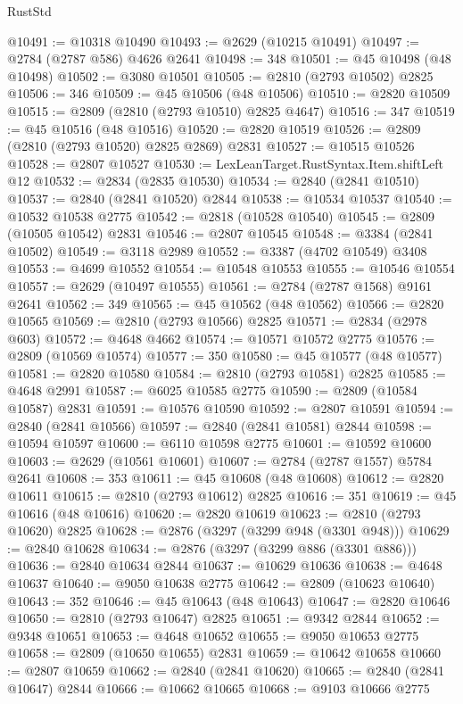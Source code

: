 \begin{lexlean}{RustStd}
\begin{coremodule}
@10491 := @10318 @10490
@10493 := @2629 (@10215 @10491)
@10497 := @2784 (@2787 @586) @4626 @2641
@10498 := 348
@10501 := @45 @10498 (@48 @10498)
@10502 := @3080 @10501
@10505 := @2810 (@2793 @10502) @2825
@10506 := 346
@10509 := @45 @10506 (@48 @10506)
@10510 := @2820 @10509
@10515 := @2809 (@2810 (@2793 @10510) @2825 @4647)
@10516 := 347
@10519 := @45 @10516 (@48 @10516)
@10520 := @2820 @10519
@10526 := @2809 (@2810 (@2793 @10520) @2825 @2869) @2831
@10527 := @10515 @10526
@10528 := @2807 @10527
@10530 := LexLeanTarget.RustSyntax.Item.shiftLeft @12
@10532 := @2834 (@2835 @10530)
@10534 := @2840 (@2841 @10510)
@10537 := @2840 (@2841 @10520) @2844
@10538 := @10534 @10537
@10540 := @10532 @10538 @2775
@10542 := @2818 (@10528 @10540)
@10545 := @2809 (@10505 @10542) @2831
@10546 := @2807 @10545
@10548 := @3384 (@2841 @10502)
@10549 := @3118 @2989
@10552 := @3387 (@4702 @10549) @3408
@10553 := @4699 @10552
@10554 := @10548 @10553
@10555 := @10546 @10554
@10557 := @2629 (@10497 @10555)
@10561 := @2784 (@2787 @1568) @9161 @2641
@10562 := 349
@10565 := @45 @10562 (@48 @10562)
@10566 := @2820 @10565
@10569 := @2810 (@2793 @10566) @2825
@10571 := @2834 (@2978 @603)
@10572 := @4648 @4662
@10574 := @10571 @10572 @2775
@10576 := @2809 (@10569 @10574)
@10577 := 350
@10580 := @45 @10577 (@48 @10577)
@10581 := @2820 @10580
@10584 := @2810 (@2793 @10581) @2825
@10585 := @4648 @2991
@10587 := @6025 @10585 @2775
@10590 := @2809 (@10584 @10587) @2831
@10591 := @10576 @10590
@10592 := @2807 @10591
@10594 := @2840 (@2841 @10566)
@10597 := @2840 (@2841 @10581) @2844
@10598 := @10594 @10597
@10600 := @6110 @10598 @2775
@10601 := @10592 @10600
@10603 := @2629 (@10561 @10601)
@10607 := @2784 (@2787 @1557) @5784 @2641
@10608 := 353
@10611 := @45 @10608 (@48 @10608)
@10612 := @2820 @10611
@10615 := @2810 (@2793 @10612) @2825
@10616 := 351
@10619 := @45 @10616 (@48 @10616)
@10620 := @2820 @10619
@10623 := @2810 (@2793 @10620) @2825
@10628 := @2876 (@3297 (@3299 @948 (@3301 @948)))
@10629 := @2840 @10628
@10634 := @2876 (@3297 (@3299 @886 (@3301 @886)))
@10636 := @2840 @10634 @2844
@10637 := @10629 @10636
@10638 := @4648 @10637
@10640 := @9050 @10638 @2775
@10642 := @2809 (@10623 @10640)
@10643 := 352
@10646 := @45 @10643 (@48 @10643)
@10647 := @2820 @10646
@10650 := @2810 (@2793 @10647) @2825
@10651 := @9342 @2844
@10652 := @9348 @10651
@10653 := @4648 @10652
@10655 := @9050 @10653 @2775
@10658 := @2809 (@10650 @10655) @2831
@10659 := @10642 @10658
@10660 := @2807 @10659
@10662 := @2840 (@2841 @10620)
@10665 := @2840 (@2841 @10647) @2844
@10666 := @10662 @10665
@10668 := @9103 @10666 @2775

\end{coremodule}
\end{lexlean}
